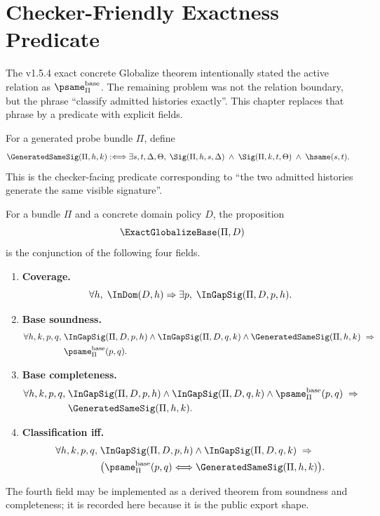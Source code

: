 \chapter{Checker-Friendly Exactness Predicate}
\label{ch:v155-checker-friendly-exactness}

The v1.5.4 exact concrete Globalize theorem intentionally stated the active relation as \(\psame_{\Pi}^{\mathrm{base}}\). The remaining problem was not the relation boundary, but the phrase ``classify admitted histories exactly''. This chapter replaces that phrase by a predicate with explicit fields.

\begin{definition}
\label{def:v155-generated-same-sig}
For a generated probe bundle \(\Pi\), define
\[
\begin{aligned}
\GeneratedSameSig(\Pi,h,k) :\Longleftrightarrow\;&
\exists s,t,\Delta,\Theta,\;\Sig(\Pi,h,s,\Delta)\;\wedge\;\Sig(\Pi,k,t,\Theta)\;\wedge\;\hsame(s,t).
\end{aligned}
\]
This is the checker-facing predicate corresponding to ``the two admitted histories generate the same visible signature''.
\end{definition}

\begin{definition}
\label{def:v155-exact-globalize-base}
For a bundle \(\Pi\) and a concrete domain policy \(D\), the proposition
\[
  \ExactGlobalizeBase(\Pi,D)
\]
is the conjunction of the following four fields.
\begin{enumerate}
  \item \textbf{Coverage.}
  \[
    \forall h,\; \InDom(D,h)\Rightarrow \exists p,\;\InGapSig(\Pi,D,p,h).
  \]
  \item \textbf{Base soundness.}
  \[
  \begin{aligned}
    \forall h,k,p,q,\;&\InGapSig(\Pi,D,p,h)\wedge\InGapSig(\Pi,D,q,k)\wedge\GeneratedSameSig(\Pi,h,k)\;\Rightarrow\\
    &\psame_{\Pi}^{\mathrm{base}}(p,q).
  \end{aligned}
  \]
  \item \textbf{Base completeness.}
  \[
  \begin{aligned}
    \forall h,k,p,q,\;&\InGapSig(\Pi,D,p,h)\wedge\InGapSig(\Pi,D,q,k)\wedge\psame_{\Pi}^{\mathrm{base}}(p,q)\;\Rightarrow\\
    &\GeneratedSameSig(\Pi,h,k).
  \end{aligned}
  \]
  \item \textbf{Classification iff.}
  \[
  \begin{aligned}
    \forall h,k,p,q,\;&\InGapSig(\Pi,D,p,h)\wedge\InGapSig(\Pi,D,q,k)\;\Rightarrow\\
    &\bigl(\psame_{\Pi}^{\mathrm{base}}(p,q)\Longleftrightarrow \GeneratedSameSig(\Pi,h,k)\bigr).
  \end{aligned}
  \]
\end{enumerate}
The fourth field may be implemented as a derived theorem from soundness and completeness; it is recorded here because it is the public export shape.
\end{definition}

